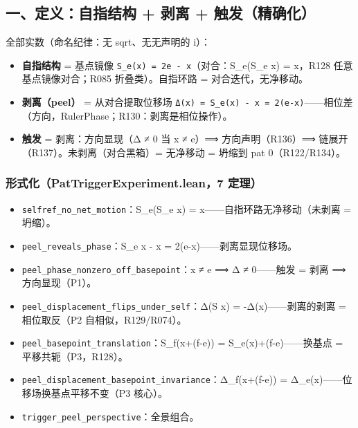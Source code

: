 \documentclass[
]{article}
\providecommand{\tightlist}{%
 \setlength{\itemsep}{0pt}\setlength{\parskip}{0pt}}
\begin{document}
\subsection{一、定义：自指结构 + 剥离 +
触发（精确化）}\label{ux4e00ux5b9aux4e49ux81eaux6307ux7ed3ux6784-ux5265ux79bb-ux89e6ux53d1ux7cbeux786eux5316}

全部实数（命名纪律：无 sqrt、无无声明的 i）：

\begin{itemize}
\tightlist
\item
 \textbf{自指结构} = 基点镜像
 \texttt{S\_e(x)\ =\ 2e\ -\ x}（对合：S\_e(S\_e x) = x，R128
 任意基点镜像对合；R085 折叠类）。自指环路 = 对合迭代，无净移动。
\item
 \textbf{剥离（peel）} = 从对合提取位移场
 \texttt{Δ(x)\ =\ S\_e(x)\ -\ x\ =\ 2(e-x)}------相位差（方向，RulerPhase；R130：剥离是相位操作）。
\item
 \textbf{触发} = 剥离：方向显现（Δ ≠ 0 当 x ≠ e）⟹ 方向声明（R136）⟹
 链展开（R137）。未剥离（对合黑箱）= 无净移动 = 坍缩到 pat
 0（R122/R134）。
\end{itemize}

\subsubsection{形式化（PatTriggerExperiment.lean，7
定理）}\label{ux5f62ux5f0fux5316pattriggerexperiment.lean7-ux5b9aux7406}

\begin{itemize}
\tightlist
\item
 \texttt{selfref\_no\_net\_motion}：S\_e(S\_e x) =
 x------自指环路无净移动（未剥离 = 坍缩）。
\item
 \texttt{peel\_reveals\_phase}：S\_e x - x =
 2(e-x)------剥离显现位移场。
\item
 \texttt{peel\_phase\_nonzero\_off\_basepoint}：x ≠ e ⟹ Δ ≠ 0------触发
 = 剥离 ⟹ 方向显现（P1）。
\item
 \texttt{peel\_displacement\_flips\_under\_self}：Δ(S x) =
 -Δ(x)------剥离的剥离 = 相位取反（P2 自相似，R129/R074）。
\item
 \texttt{peel\_basepoint\_translation}：S\_f(x+(f-e)) =
 S\_e(x)+(f-e)------换基点 = 平移共轭（P3，R128）。
\item
 \texttt{peel\_displacement\_basepoint\_invariance}：Δ\_f(x+(f-e)) =
 Δ\_e(x)------位移场换基点平移不变（P3 核心）。
\item
 \texttt{trigger\_peel\_perspective}：全景组合。
\end{itemize}
\end{document}
